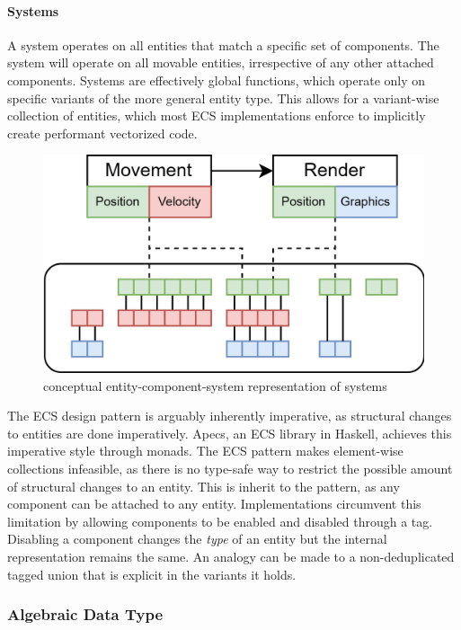 \documentclass{article}
\newcommand{\type}[1]{\smash{\colorbox{codegray}{\texttt{#1}}}}
\begin{document}
\paragraph{Systems}
A system operates on all entities that match a specific set of components.
The \type{Movement} system will operate on all movable entities, irrespective of any other attached components.
Systems are effectively global functions, which operate only on specific variants of the more general entity type. 
This allows for a variant-wise collection of entities, which most ECS implementations enforce to implicitly create performant vectorized code.

\begin{figure}[ht]
    \centering
    \includegraphics[scale=0.2]{ecs}
    \caption{ conceptual entity-component-system representation of systems }
\end{figure}

The ECS design pattern is arguably inherently imperative, as structural changes to entities are done imperatively.
Apecs, an ECS library in Haskell, achieves this imperative style through monads\cite{ecs-apecs}.
The ECS pattern makes element-wise collections infeasible, as there is no type-safe way to restrict the possible amount of structural changes to an entity.
This is inherit to the pattern, as any component can be attached to any entity.
Implementations circumvent this limitation by allowing components to be enabled and disabled through a tag.
Disabling a component changes the {\it type} of an entity but the internal representation remains the same.
An analogy can be made to a non-deduplicated tagged union that is explicit in the variants it holds.

\newpage

\subsubsection{Algebraic Data Type}
\end{document}
